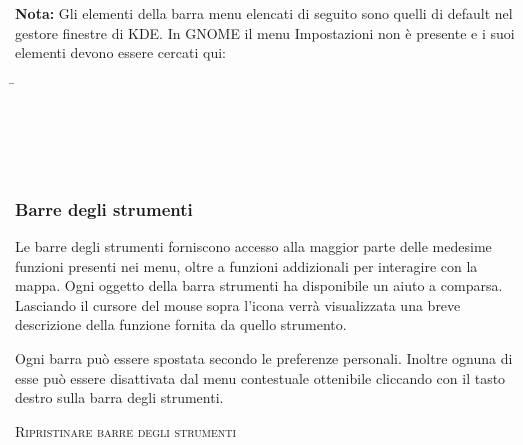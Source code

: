 \textbf{Nota:} \nix Gli elementi della barra menu elencati di seguito sono quelli di default nel gestore finestre di KDE. 
In GNOME il menu Impostazioni non è presente e i suoi elementi devono essere cercati
qui:
\begin{tabbing}
 \hspace{3cm}\=
 \\
 \hspace{3cm}\>
\\
\hspace{3cm}\>
 \\
 \hspace{3cm}\>
 \\
   \hspace{3cm}\>
 \\
 \hspace{3cm}\>
\end{tabbing}


\subsubsection{Barre degli strumenti}\label{label_toolbars}

Le barre degli strumenti forniscono accesso alla maggior parte delle medesime funzioni presenti nei menu,
oltre a funzioni addizionali per interagire con la mappa. Ogni oggetto della barra strumenti
ha disponibile un aiuto a comparsa. Lasciando il cursore del mouse sopra l'icona verrà
visualizzata una breve descrizione della funzione fornita da quello strumento.

Ogni barra può essere spostata secondo le preferenze personali. Inoltre ognuna di esse
può essere disattivata dal menu contestuale ottenibile cliccando con il tasto destro
sulla barra degli strumenti.

\begin{Tip}
\caption{\textsc{Ripristinare barre degli strumenti}} 
\end{Tip}

